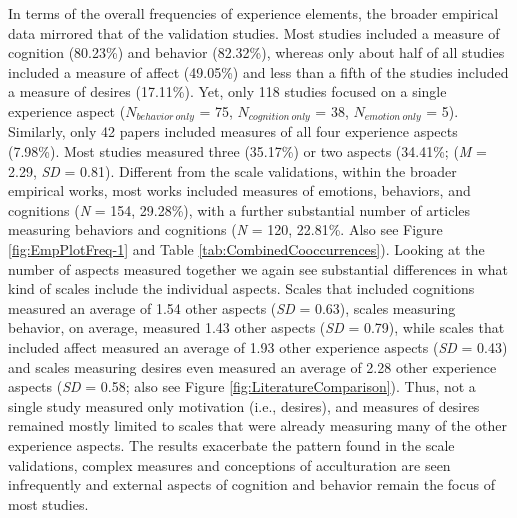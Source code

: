 In terms of the overall frequencies of experience elements, the broader
empirical data mirrored that of the validation studies. Most studies
included a measure of cognition (80.23\%) and behavior (82.32\%),
whereas only about half of all studies included a measure of affect
(49.05\%) and less than a fifth of the studies included a measure of
desires (17.11\%). Yet, only 118 studies focused on a single experience
aspect (\(N_{behavior\ only}\) = 75, \(N_{cognition\ only}\) = 38,
\(N_{emotion\ only}\) = 5). Similarly, only 42 papers included measures
of all four experience aspects (7.98\%). Most studies measured three
(35.17\%) or two aspects (34.41\%; (\textit{M} = 2.29, \textit{SD} =
0.81). Different from the scale validations, within the broader
empirical works, most works included measures of emotions, behaviors,
and cognitions (\textit{N} = 154, 29.28\%), with a further substantial
number of articles measuring behaviors and cognitions (\textit{N} = 120,
22.81\%. Also see Figure \ref{fig:EmpPlotFreq-1} and Table
\ref{tab:CombinedCooccurrences}). Looking at the number of aspects
measured together we again see substantial differences in what kind of
scales include the individual aspects. Scales that included cognitions
measured an average of 1.54 other aspects (\textit{SD} = 0.63), scales
measuring behavior, on average, measured 1.43 other aspects (\textit{SD}
= 0.79), while scales that included affect measured an average of 1.93
other experience aspects (\textit{SD} = 0.43) and scales measuring
desires even measured an average of 2.28 other experience aspects
(\textit{SD} = 0.58; also see Figure \ref{fig:LiteratureComparison}).
Thus, not a single study measured only motivation (i.e., desires), and
measures of desires remained mostly limited to scales that were already
measuring many of the other experience aspects. The results exacerbate
the pattern found in the scale validations, complex measures and
conceptions of acculturation are seen infrequently and external aspects
of cognition and behavior remain the focus of most studies.

